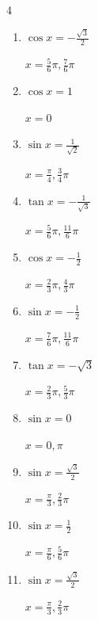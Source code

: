 \begin{multicols}{4}
\begin{enumerate}
        $\displaystyle x = \frac{5}{4}\pi , \frac{7}{4}\pi$

  \item $\displaystyle \cos{x}  = -\frac{\sqrt{3}}{2}$

        $\displaystyle x = \frac{5}{6}\pi , \frac{7}{6}\pi$

  \item $\displaystyle \cos{x}  = 1$

        $\displaystyle x = 0$

  \item $\displaystyle \sin{x}  = \frac{1}{\sqrt{2}}$

        $\displaystyle x = \frac{\pi}{4} , \frac{3}{4}\pi$

  \item $\displaystyle \tan{x}  = -\frac{1}{\sqrt{3}}$

        $\displaystyle x = \frac{5}{6}\pi , \frac{11}{6}\pi$

  \item $\displaystyle \cos{x}  = -\frac{1}{2}$

        $\displaystyle x = \frac{2}{3}\pi , \frac{4}{3}\pi$

  \item $\displaystyle \sin{x}  = -\frac{1}{2}$

        $\displaystyle x = \frac{7}{6}\pi , \frac{11}{6}\pi$

  \item $\displaystyle \tan{x}  = -\sqrt{3}$

        $\displaystyle x = \frac{2}{3}\pi , \frac{5}{3}\pi$

\columnbreak %

  \item $\displaystyle \sin{x}  = 0$

        $\displaystyle x = 0 , \pi$

  \item $\displaystyle \sin{x}  = \frac{\sqrt{3}}{2}$

        $\displaystyle x = \frac{\pi}{3} , \frac{2}{3}\pi$

  \item $\displaystyle \sin{x}  = \frac{1}{2}$

        $\displaystyle x = \frac{\pi}{6} , \frac{5}{6}\pi$

  \item $\displaystyle \sin{x}  = \frac{\sqrt{3}}{2}$

        $\displaystyle x = \frac{\pi}{3} , \frac{2}{3}\pi$


\end{enumerate}
\end{multicols}
